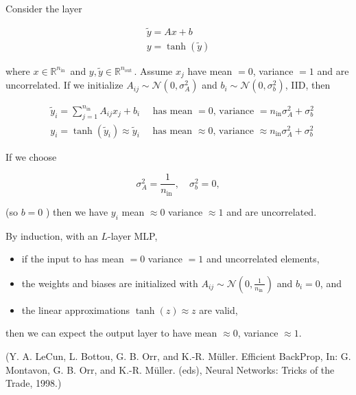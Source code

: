 \begin{definition}
    Consider the layer

    $$
    \begin{gathered}
    \tilde{y}=A x+b \\
    y=\tanh (\tilde{y})
    \end{gathered}
    $$

    where $x \in \mathbb{R}^{n_{\text {in }}}$ and $y, \tilde{y} \in \mathbb{R}^{n_{\text {out }}}$. Assume $x_{j}$ have mean $=0$, variance $=1$ and are uncorrelated. If we initialize $A_{i j} \sim \mathcal{N}\left(0, \sigma_{A}^{2}\right)$ and $b_{i} \sim \mathcal{N}\left(0, \sigma_{b}^{2}\right)$, IID, then

    $$
    \begin{aligned}
    & \tilde{y}_{i}=\sum_{j=1}^{n_{\mathrm{in}}} A_{i j} x_{j}+b_{i} \quad \text { has mean }=0 \text {, variance }=n_{\mathrm{in}} \sigma_{A}^{2}+\sigma_{b}^{2} \\
    & y_{i}=\tanh \left(\tilde{y}_{i}\right) \approx \tilde{y}_{i} \quad \text { has mean } \approx 0 \text {, variance } \approx n_{\mathrm{in}} \sigma_{A}^{2}+\sigma_{b}^{2}
    \end{aligned}
    $$

    If we choose

    $$
    \sigma_{A}^{2}=\frac{1}{n_{\text {in }}}, \quad \sigma_{b}^{2}=0,
    $$

    (so $b=0$ ) then we have $y_{i}$ mean $\approx 0$ variance $\approx 1$ and are uncorrelated.

    \par\noindent\textcolor{gray}{\hdashrule{\textwidth}{0.4pt}{1pt 2pt}}

    By induction, with an $L$-layer MLP,

    \begin{itemize}
        \item if the input to has mean $=0$ variance $=1$ and uncorrelated elements,
        \item the weights and biases are initialized with $A_{i j} \sim \mathcal{N}\left(0, \frac{1}{n_{\text {in }}}\right)$ and $b_{i}=0$, and
        \item the linear approximations $\tanh (z) \approx z$ are valid,
    \end{itemize}

    then we can expect the output layer to have mean $\approx 0$, variance $\approx 1$.

    (Y. A. LeCun, L. Bottou, G. B. Orr, and K.-R. Müller. Efficient BackProp, In: G. Montavon, G. B. Orr, and K.-R. Müller. (eds), Neural Networks: Tricks of the Trade, 1998.)
\end{definition}

